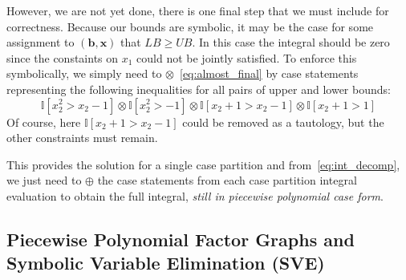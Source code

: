 \documentclass[letterpaper]{article}
\newcommand{\LB}{\mathit{LB}}
\newcommand{\UB}{\mathit{UB}}
\newcommand{\I}{\mathbb{I}}
\renewcommand{\vec}[1]{\mathbf{#1}}
\begin{document}
However, we are not yet done, there is one final step that we must
include for correctness.  Because our bounds are symbolic, it may be
the case for some assignment to $(\vec{b},\vec{x})$ that $\LB \geq
\UB$.  In this case the integral should be zero since the constaints
on $x_1$ could not be jointly satisfied.  To enforce this
symbolically, we simply need to $\otimes$~\eqref{eq:almost_final} by
case statements representing the following inequalities for all pairs
of upper and lower bounds:
{\footnotesize
\begin{equation}
\I[x_2^2 > x_2 - 1] \otimes \I[x_2^2 > -1] \otimes \I[x_2 + 1 > x_2 - 1] \otimes \I[x_2 + 1 > 1]
\end{equation}}
Of course, here $\I[x_2 + 1 > x_2 - 1]$ could be removed as a tautology,
but the other constraints must remain.

This provides the solution for a single case partition and 
from~\eqref{eq:int_decomp}, we just need to $\oplus$ the case
statements from each case partition integral evaluation to obtain
the full integral, \emph{still in piecewise polynomial case form}.






%


\subsection{Piecewise Polynomial Factor Graphs and Symbolic Variable Elimination (SVE)}
\end{document}
